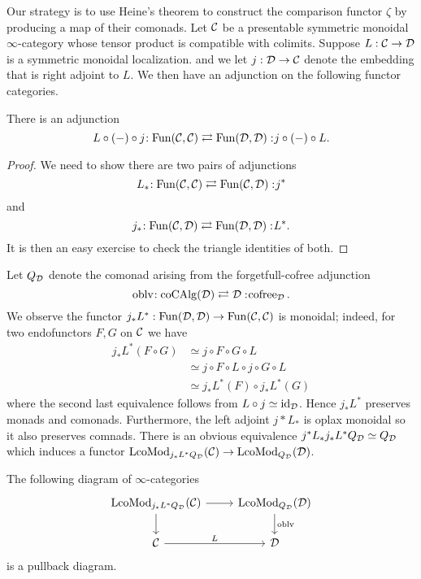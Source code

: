 Our strategy is to use Heine's theorem to construct the comparison functor $\zeta$ by producing a map of their comonads.
Let ${\mathcal{C}}$ be a presentable symmetric monoidal $\infty$-category whose tensor product is compatible with colimits.
Suppose $L:{\mathcal{C}} \to {\mathcal{D}}$ is a symmetric monoidal localization.
and we let $j:{\mathcal{D}} \to {\mathcal{C}}$ denote the embedding that is right adjoint to $L$.
We then have an adjunction on the following functor categories.
\begin{proposition}
There is an adjunction
$$
    L\circ (-)\circ j\negmedspace: \operatorname{Fun}({\mathcal{C}}, {\mathcal{C}})\rightleftarrows \operatorname{Fun}({\mathcal{D}}, {\mathcal{D}}):\negmedspace j\circ (-)\circ L.
$$
\end{proposition}
\begin{proof}
    We need to show there are two pairs of adjunctions
    $$
    L_{*}\negmedspace: \operatorname{Fun}({\mathcal{C}}, {\mathcal{C}})\rightleftarrows \operatorname{Fun}({\mathcal{C}}, {\mathcal{D}}):\negmedspace j^*
    $$
    and
    $$
    j_{*}\negmedspace: \operatorname{Fun}({\mathcal{C}}, {\mathcal{D}})\rightleftarrows \operatorname{Fun}({\mathcal{D}}, {\mathcal{D}}):\negmedspace L^*.
    $$
    It is then an easy exercise to check the triangle identities of both.
\end{proof}
Let $Q_{{\mathcal{D}}}$ denote the comonad arising from the forgetfull-cofree adjunction 
$$\operatorname{oblv}\negmedspace: \operatorname{coCAlg}({\mathcal{D}})\rightleftarrows {\mathcal{D}}:\negmedspace \operatorname{cofree}_{{\mathcal{D}}}.$$
We observe the functor $j_*L^*: \operatorname{Fun}({\mathcal{D}},{\mathcal{D}}) \to \operatorname{Fun}({\mathcal{C}},{\mathcal{C}})$ is monoidal; indeed, for two endofunctors $F,G$ on ${\mathcal{C}}$ we have
\begin{align*}
    j_*L^*(F\circ G) & \simeq j\circ F \circ G \circ L\\
                     & \simeq j\circ F \circ L \circ j \circ  G \circ L \\
                     & \simeq j_*L^*(F)\circ j_*L^*(G)
\end{align*}
where the second last equivalence follows from $ L \circ j \simeq \operatorname{id}_{{\mathcal{D}}}$.
Hence $j_*L^*$ preserves monads and comonads. Furthermore, the left adjoint $j*L_*$ is oplax monoidal so it also preserves comnads. 
There is an obvious equivalence
$
j^*L_*j_*L^*Q_{{\mathcal{D}}}\simeq Q_{{\mathcal{D}}}
$
which induces a functor $\operatorname{LcoMod}_{j_*L^*Q_{\mathcal{D}}}({\mathcal{C}}) \to \operatorname{LcoMod}_{Q_{\mathcal{D}}}({\mathcal{D}})$.

\begin{proposition}
\label{Pullback diagram in Prop A4.2}
The following diagram of $\infty$-categories
\[
\begin{tikzcd}
	\LcoMod_{j_*L^*Q_\CD}(\CC) & \LcoMod_{Q_\CD}(\CD)\\
    \CC & \CD
	\arrow[from=1-1, to= 1-2]
	\arrow[from=1-1, to=2-1]
	\arrow[from=1-2, to=2-2, "\oblv"]
	\arrow[from=2-1, to= 2-2, "L"]
\end{tikzcd}
\]
is a pullback diagram.
\end{proposition}

